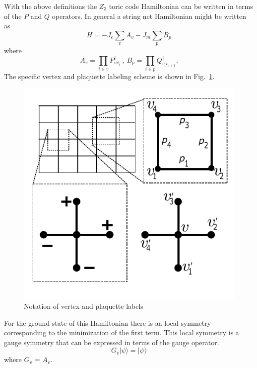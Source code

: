 \documentclass[twocolumn,prb,aps,floatfix,superscriptaddress]{revtex4-1}
\begin{document}
        With the above definitions the $Z_3$ toric code Hamiltonian can be written in terms of the $P$ and $Q$ operators.
        In general a string net Hamiltonian might be written as 
        \begin{equation}
            H = - J_e \sum_v A_v - J_m \sum_p B_p
        \end{equation}
        where 
        \begin{equation}
            A_v = \prod_{i\in v} P^\dagger_{vv_i}~,~ B_p = \prod_{i\in p} Q^\dagger_{v_iv_{i+1}}
            .
        \end{equation}
        The specific vertex and plaquette labeling scheme is shown in Fig.~\ref{fig:vertex_link_labels}.
        \begin{figure}[htpb]
            \centering
            \includegraphics[width=0.8\linewidth]{vertex_link_gauge_def}
            \caption{Notation of vertex and plaquette labels}
            \label{fig:vertex_link_labels}
        \end{figure}
        For the ground state of this Hamiltonian there is aa local symmetry corresponding to the
        minimization of the first term. This local symmetry is a gauge symmetry that can be
        expressed in terms of the gauge operator.
        \begin{equation}
            G_v | \psi \rangle= | \psi \rangle
        \end{equation}
        where $G_v$ = $A_v$.
\end{document}
